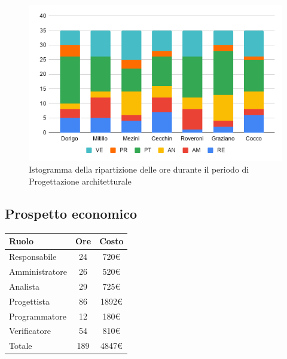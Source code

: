 {{{{{\begin{figure}[!ht]
	\begin{center}
		\includegraphics[width=0.8\linewidth]{../immagini/pdp/istogramma_progettazione_architetturale.png}
		\caption{Istogramma della ripartizione delle ore durante il periodo di Progettazione
			architetturale}
	\end{center}
\end{figure}

\subsection{Prospetto economico}\label{PreventivoFaseDiProgettazioneArchitetturaleProspettoEconomico}
\quad
\def\tabularxcolumn#1{m{#1}}
{	
	\begin{center}
		\renewcommand{\arraystretch}{1.4}
		\begin{tabularx}{7cm}{|X|c|c|}
			\hline
			\rowcolor{airforceblue}
			\textbf{Ruolo} & \textbf{Ore} & \textbf{Costo}\\
			\hline
			Responsabile & 24 & 720\euro\\
			\hline
			Amministratore & 26 & 520\euro\\
			\hline
			Analista & 29 & 725\euro\\
			\hline
			Progettista & 86 & 1892\euro\\
			\hline
			Programmatore & 12 & 180\euro\\
			\hline
			Verificatore & 54 & 810\euro\\
			\hline
			Totale & 189 & 4847\euro\\
			\hline
		\end{tabularx}
	\end{center}

}}}}}}
